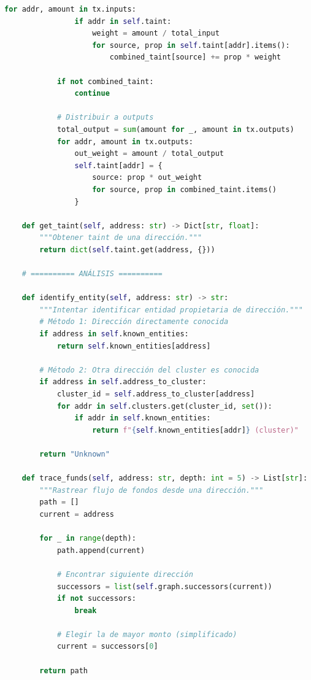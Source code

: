 \documentclass[11pt,a4paper,twoside]{book}
\theoremstyle{definition}
\theoremstyle{remark}
\begin{document}
\begin{lstlisting}[language=Python, caption={Simulación de técnicas de Chainalysis}]
            for addr, amount in tx.inputs:
                if addr in self.taint:
                    weight = amount / total_input
                    for source, prop in self.taint[addr].items():
                        combined_taint[source] += prop * weight
            
            if not combined_taint:
                continue
            
            # Distribuir a outputs
            total_output = sum(amount for _, amount in tx.outputs)
            for addr, amount in tx.outputs:
                out_weight = amount / total_output
                self.taint[addr] = {
                    source: prop * out_weight
                    for source, prop in combined_taint.items()
                }
    
    def get_taint(self, address: str) -> Dict[str, float]:
        """Obtener taint de una dirección."""
        return dict(self.taint.get(address, {}))
    
    # ========== ANÁLISIS ==========
    
    def identify_entity(self, address: str) -> str:
        """Intentar identificar entidad propietaria de dirección."""
        # Método 1: Dirección directamente conocida
        if address in self.known_entities:
            return self.known_entities[address]
        
        # Método 2: Otra dirección del cluster es conocida
        if address in self.address_to_cluster:
            cluster_id = self.address_to_cluster[address]
            for addr in self.clusters.get(cluster_id, set()):
                if addr in self.known_entities:
                    return f"{self.known_entities[addr]} (cluster)"
        
        return "Unknown"
    
    def trace_funds(self, address: str, depth: int = 5) -> List[str]:
        """Rastrear flujo de fondos desde una dirección."""
        path = []
        current = address
        
        for _ in range(depth):
            path.append(current)
            
            # Encontrar siguiente dirección
            successors = list(self.graph.successors(current))
            if not successors:
                break
            
            # Elegir la de mayor monto (simplificado)
            current = successors[0]
        
        return path
    

\end{lstlisting}
\end{document}
